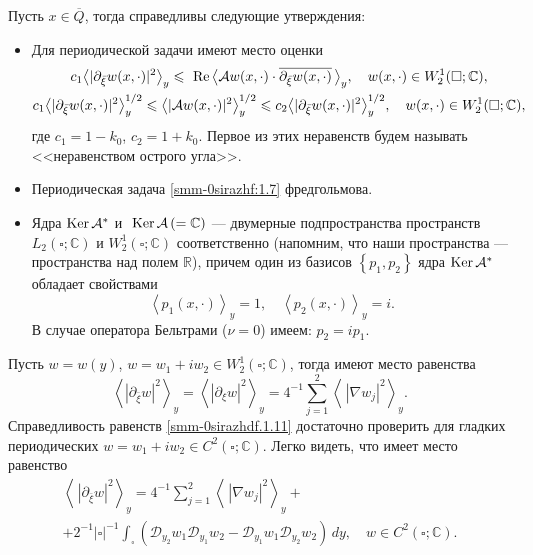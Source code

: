 \begin{theorem}\label{smm2-th3}  Пусть $x\in\overline Q$, тогда справедливы следующие утверждения:
\begin{itemize}
	\item  {Для периодической задачи имеют место оценки}
	\begin{gather}\label{smm-0sirazhf:1.9}
		c_1\big<|\partial_{\bar{\xi}}w(x,\cdot)|^2\big>_y\leqslant \text{ Re\,}\big<\mathcal{A}w(x,\cdot)\cdot \overline{\partial_{\bar{\xi}}w(x,\cdot)}\,\big>_y,\quad  w(x,\cdot)\in W_2^1(\square;\mathbb{C}),\\
		c_1\big<|\partial_{\bar{\xi}}w(x,\cdot)|^2\big>_y^{1/2}\leqslant
		\big<|\mathcal{A}w(x,\cdot)|^2\big>_y^{1/2}\leqslant c_2\big<|\partial_{\bar{\xi}}w(x,\cdot)|^2\big>_y^{1/2},\quad  w(x,\cdot)\in W_2^1(\square;\mathbb{C}),\label{smm-0sirazhf:1.9'}
	\end{gather}
	{ где $c_1=1-k_0$, $c_2=1+k_0$. Первое из этих неравенств будем называть <<неравенством острого угла>>}.
	\item { Периодическая задача \eqref{smm-0sirazhf:1.7} фредгольмова.}
	\item {Ядра  $\text{Ker\,}\mathcal{A}^\ast$ и $\text{ Ker\,}\mathcal{A}\,(=\mathbb{C})$
		--- двумерные подпространства пространств $L_2(\square;\mathbb{C})$ и $W_2^1(\square;\mathbb{C})$ соответственно {\rm(}напомним, что
		наши пространства --- пространства над полем $\mathbb{R}${\rm)},
		причем один из базисов $\left\{p_1,p_2\right\}$ ядра
		$\text{Ker\,}\mathcal{A}^\ast$ обладает свойствами
		\begin{equation}\label{smm-0sirazhdf:1.10}
			\left< p_1(x,\cdot)\right>_y=1,\quad \left< p_2(x,\cdot)\right>_y=i.
		\end{equation}
		В случае оператора Бельтрами {\rm(}$\nu=0${\rm)} имеем: $p_2=ip_1$.}
\end{itemize}
\end{theorem}
Пусть $w=w(y)$, $w=w_1+iw_2\in W_2^1(\square;\mathbb{C})$, тогда имеют место равенства
\begin{equation}\label{smm-0sirazhdf.1.11}
	\left<|\partial_{\bar{\xi}}w|^2\right>_y=\left<|\partial_{\xi}w|^2\right>_y=4^{-1}\sum_{j=1}^2\left<
	\,|\nabla w_j|^2\right>_y.
\end{equation}
Справедливость равенств \eqref{smm-0sirazhdf.1.11} достаточно проверить  для  гладких периодических $w=w_1+iw_2\in C^2(\square;\mathbb{C})$. Легко видеть, что имеет место равенство
\begin{equation}\label{smm-0sirazhdf.1.111}
	\begin{gathered}
		\left<\,|\partial_{\bar \xi} w|^2\right>_y=4^{-1}\sum_{j=1}^2\left<
		\,|\nabla w_j|^2\right>_y+\\
		+2^{-1}|\square|^{-1}\int_{\square}\left(\mathscr{D}_{y_2}w_1\mathscr{D}_{y_1}w_2-\mathscr{D}_{y_1}w_1\mathscr{D}_{y_2}w_2\right)\,dy,\quad w\in C^2(\square;\mathbb{C}).
	\end{gathered}
\end{equation}
